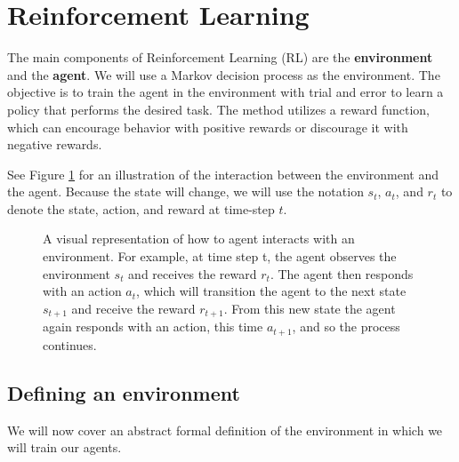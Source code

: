 \documentclass[12pt,A4]{report}
\theoremstyle{definition}
\newtheorem{definition}{Definition}[section]
\begin{document}
\section{Reinforcement Learning}
The main components of Reinforcement Learning (RL) are the \textbf{environment} and the \textbf{agent}. We will use a Markov decision process as the environment. The objective is to train the agent in the environment with trial and error to learn a policy that performs the desired task. The method utilizes a reward function, which can encourage behavior with positive rewards or discourage it with negative rewards. 

See Figure \ref{fig:RL} for an illustration of the interaction between the environment and the agent. Because the state will change, we will use the notation $s_t$, $a_t$, and $r_t$ to denote the state, action, and reward at time-step $t$.


\begin{figure}[H]
  
  \caption{A visual representation of how to agent interacts with an environment. For example, at time step t, the agent observes the environment $s_t$ and receives the reward $r_t$. The agent then responds with an action $a_t$, which will transition the agent to the next state $s_{t+1}$ and receive the reward $r_{t+1}$. From this new state the agent again responds with an action, this time $a_{t+1}$, and so the process continues. } 
  \label{fig:RL}
\end{figure} 
 

\subsection{Defining an environment}
We will now cover an abstract formal definition of the environment in which we will train our agents.
\end{document}
